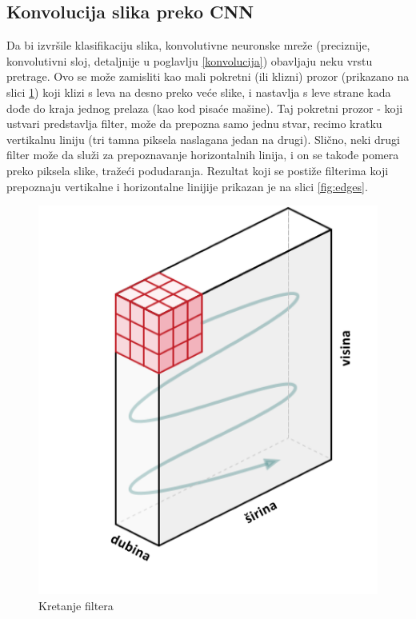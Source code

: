 \documentclass[a4paper]{article}
\begin{document}
\subsection{Konvolucija slika preko CNN}
\label{konvolucija_slika}

Da bi izvršile klasifikaciju slika, konvolutivne neuronske mreže (preciznije, konvolutivni sloj, detaljnije u poglavlju \ref{konvolucija}) obavljaju neku vrstu pretrage. Ovo se može zamisliti kao mali pokretni (ili klizni) prozor (prikazano na slici \ref{fig:filter_movement01}) koji klizi s leva na desno preko veće slike, i nastavlja s leve strane kada dođe do kraja jednog prelaza (kao kod pisaće mašine). Taj pokretni prozor - koji ustvari predstavlja filter, može da prepozna samo jednu stvar, recimo kratku vertikalnu liniju (tri tamna piksela naslagana jedan na drugi). Slično, neki drugi filter može da služi za prepoznavanje horizontalnih linija, i on se takođe pomera preko piksela slike, tražeći podudaranja. Rezultat koji se postiže filterima koji prepoznaju vertikalne i horizontalne linijije prikazan je na slici \ref{fig:edges}.


\begin{figure}[h!]
\begin{center}
\includegraphics[scale=0.4]{filter_movement01.jpg}
\end{center}
\caption{Kretanje filtera}
\label{fig:filter_movement01}
\end{figure}
\end{document}
